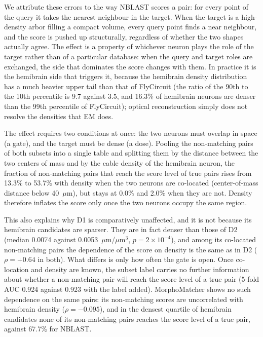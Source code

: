\documentclass[10pt,a4paper]{article}
\begin{document}
We attribute these errors to the way NBLAST scores a pair: for every point of
the query it takes the nearest neighbour in the target. When the target is a
high-density arbor filling a compact volume, every query point finds a near
neighbour, and the score is pushed up structurally, regardless of whether the
two shapes actually agree. The effect is a property of whichever neuron plays
the role of the target rather than of a particular database: when the query and
target roles are exchanged, the side that dominates the score changes with them.
In practice it is the hemibrain side that triggers it, because the hemibrain
density distribution has a much heavier upper tail than that of FlyCircuit (the
ratio of the 90th to the 10th percentile is 9.7 against 3.5, and 16.3\% of
hemibrain neurons are denser than the 99th percentile of FlyCircuit); optical
reconstruction simply does not resolve the densities that EM does.

The effect requires two conditions at once: the two neurons must overlap in
space (a gate), and the target must be dense (a dose). Pooling the non-matching
pairs of both subsets into a single table and splitting them by the distance
between the two centers of mass and by the cable density of the hemibrain
neuron, the fraction of non-matching pairs that reach the score level of true
pairs rises from 13.3\% to 53.7\% with density when the two neurons are
co-located (center-of-mass distance below 40~$\mu$m), but stays at 0.0\% and
2.0\% when they are not. Density therefore inflates the score only once the two
neurons occupy the same region.

This also explains why D1 is comparatively unaffected, and it is not because its
hemibrain candidates are sparser. They are in fact denser than those of D2
(median 0.0074 against 0.0053~$\mu$m/$\mu$m$^3$, $p = 2 \times 10^{-4}$), and
among its co-located non-matching pairs the dependence of the score on density
is the same as in D2 ($\rho = +0.64$ in both). What differs is only how often
the gate is open. Once co-location and density are known, the subset label
carries no further information about whether a non-matching pair will reach the
score level of a true pair (5-fold AUC 0.924 against 0.923 with the label
added). MorphoMatcher shows no such dependence on the same pairs: its
non-matching scores are uncorrelated with hemibrain density ($\rho = -0.095$),
and in the densest quartile of hemibrain candidates none of its non-matching
pairs reaches the score level of a true pair, against 67.7\% for NBLAST.
\end{document}
